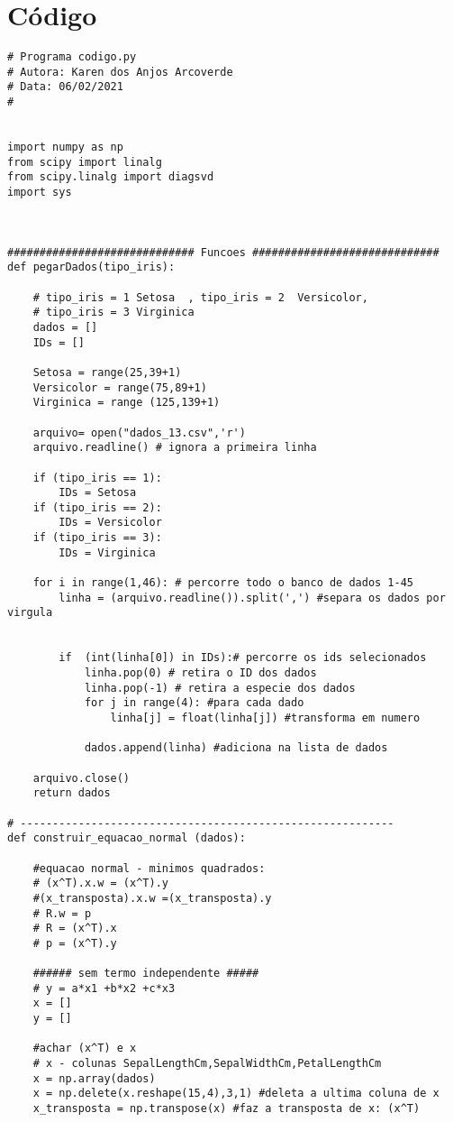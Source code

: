 \documentclass[a4paper,12pt,twoside]{article}
\begin{document}
\section{Código}
\begin{lstlisting}
# Programa codigo.py
# Autora: Karen dos Anjos Arcoverde
# Data: 06/02/2021
#


import numpy as np
from scipy import linalg
from scipy.linalg import diagsvd
import sys



############################# Funcoes #############################
def pegarDados(tipo_iris): 
    
    # tipo_iris = 1 Setosa  , tipo_iris = 2  Versicolor, 
    # tipo_iris = 3 Virginica
    dados = []
    IDs = []
    
    Setosa = range(25,39+1)
    Versicolor = range(75,89+1)
    Virginica = range (125,139+1)
    
    arquivo= open("dados_13.csv",'r')
    arquivo.readline() # ignora a primeira linha
    
    if (tipo_iris == 1):
        IDs = Setosa
    if (tipo_iris == 2):
        IDs = Versicolor
    if (tipo_iris == 3):
        IDs = Virginica
        
    for i in range(1,46): # percorre todo o banco de dados 1-45
        linha = (arquivo.readline()).split(',') #separa os dados por virgula
    
        
        if  (int(linha[0]) in IDs):# percorre os ids selecionados
            linha.pop(0) # retira o ID dos dados
            linha.pop(-1) # retira a especie dos dados
            for j in range(4): #para cada dado 
                linha[j] = float(linha[j]) #transforma em numero
                
            dados.append(linha) #adiciona na lista de dados
            
    arquivo.close()
    return dados

# ----------------------------------------------------------
def construir_equacao_normal (dados):
    
    #equacao normal - minimos quadrados:
    # (x^T).x.w = (x^T).y
    #(x_transposta).x.w =(x_transposta).y
    # R.w = p
    # R = (x^T).x
    # p = (x^T).y
    
    ###### sem termo independente #####
    # y = a*x1 +b*x2 +c*x3
    x = []
    y = []
    
    #achar (x^T) e x
    # x - colunas SepalLengthCm,SepalWidthCm,PetalLengthCm
    x = np.array(dados) 
    x = np.delete(x.reshape(15,4),3,1) #deleta a ultima coluna de x
    x_transposta = np.transpose(x) #faz a transposta de x: (x^T)
    

\end{lstlisting}
\end{document}
